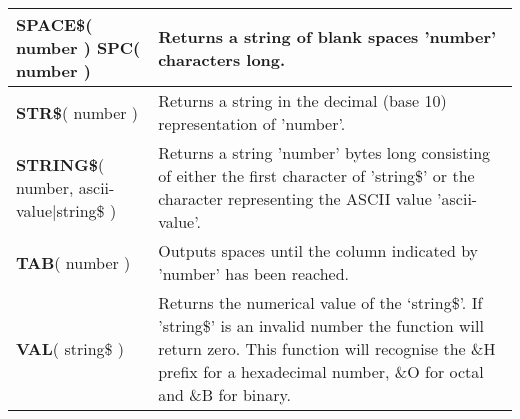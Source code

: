 \begin{table}[]
\begin{tabular}{|p{4cm}|p{10cm}|}
\\ \hline
\textbf{SPACE\$}( number ) \newline
\textbf{SPC}( number ) 
& Returns a string of blank spaces 'number' characters long.
\\ \hline
\textbf{STR\$}( number ) & Returns a string in the decimal (base 10) representation of 'number'.
\\ \hline
\textbf{STRING\$}( number, ascii-
value|string\$ )
 & Returns a string 'number' bytes long consisting of either the first
character of 'string\$' or the character representing the ASCII value 'ascii-
value'.
\\ \hline
\textbf{TAB}( number ) & Outputs spaces until the column indicated by 'number' has been reached.
\\ \hline
\textbf{VAL}( string\$ ) & Returns the numerical value of the ‘string\$’. If 'string\$' is an invalid number the function will return zero. This function will recognise the \&H prefix for a hexadecimal number, \&O for octal and \&B for binary.
\\ \hline
\end{tabular}
\end{table}

